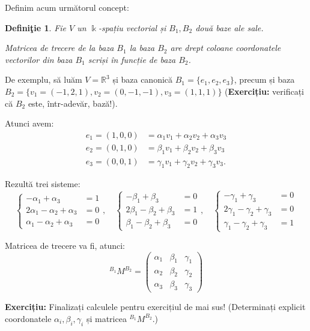 \documentclass[11pt,a4paper]{article}
\newcommand\RR{\mathbb{R}}
\theoremstyle{dotless}
\theoremstyle{dotlessdr}
\newtheorem{definition}{Defini\c{t}ie}[section]
\begin{document}
Definim acum următorul concept:
\begin{definition}\label{def:matrecere}
  Fie $V$ un $\Bbbk$-spațiu vectorial și $B_1, B_2$ două baze ale sale.

  \emph{Matricea de trecere} de la baza $B_1$ la baza $B_2$ are drept coloane
  coordonatele vectorilor din baza $B_1$ scriși în funcție de baza $B_2$.
\end{definition}

De exemplu, să luăm $V = \RR^3$ și baza canonică $B_1 = \{ e_1, e_2, e_3 \}$,
precum și baza $B_2 = \{ v_1 = (-1, 2, 1), v_2 = (0, -1, -1), v_3 = (1, 1, 1) \}$
(\textbf{Exercițiu:} verificați că $B_2$ este, într-adevăr, bază!).

Atunci avem:
\begin{align*}
  e_1 = (1, 0, 0) &= \alpha_1 v_1 + \alpha_2 v_2 + \alpha_3 v_3 \\
  e_2 = (0, 1, 0) &= \beta_1 v_1 + \beta_2 v_2 + \beta_3 v_3 \\
  e_3 = (0, 0, 1) &= \gamma_1 v_1 + \gamma_2 v_2 + \gamma_3 v_3.
\end{align*}

Rezultă trei sisteme:
\[
  \begin{cases}
    -\alpha_1 + \alpha_3 &= 1 \\
    2 \alpha_1 - \alpha_2 + \alpha_3 &= 0 \\
    \alpha_1 - \alpha_2 + \alpha_3 &= 0
  \end{cases}, \quad
  \begin{cases}
    -\beta_1 + \beta_3 &= 0 \\
    2 \beta_1 - \beta_2 + \beta_3 &= 1 \\
    \beta_1 - \beta_2 + \beta_3 &= 0
  \end{cases}, \quad
  \begin{cases}
    -\gamma_1 + \gamma_3 &= 0 \\
    2 \gamma_1 - \gamma_2 + \gamma_3 &= 0 \\
    \gamma_1 - \gamma_2 + \gamma_3 &= 1
  \end{cases}
\]

Matricea de trecere va fi, atunci:
\[
  {}^{B_1} M^{B_2} =
  \begin{pmatrix}
    \alpha_1 & \beta_1 & \gamma_1 \\
    \alpha_2 & \beta_2 & \gamma_2 \\
    \alpha_3 & \beta_3 & \gamma_3
  \end{pmatrix}
\]

\textbf{Exercițiu:} Finalizați calculele pentru exercițiul de mai sus! (Determinați
explicit coordonatele $\alpha_i, \beta_i, \gamma_i$ și matricea ${}^{B_1} M^{B_2}$.)
\end{document}
